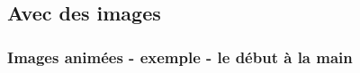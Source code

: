 \subsection{Avec des images}
\begin{frame}
\frametitle{Images animées - exemple - le début à la main}
  \begin{figure}

\end{figure}
\end{frame}
